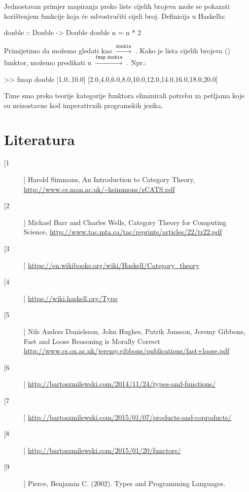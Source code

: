   Jednostavan primjer mapiranja preko liste cijelih brojeva može se pokazati
  korištenjem funkcije  koja će udvostručiti cijeli broj.
  Definicija  u Haskellu:
  \begin{mcode}
    double :: Double -> Double
    double n = n * 2
  \end{mcode}
  Primijetimo da  možemo gledati kao 
  $\xrightarrow{\texttt{double}}$ . Kako je lista cijelih
  brojeva (\codei{[Double]}) funktor, možemo preslikati  
  u \codei{[Double]} $\xrightarrow{\texttt{fmap double}}$
  \codei{[Double]}. Npr.:
  \begin{mcode}
    >> fmap double [1.0..10.0]
    [2.0,4.0,6.0,8.0,10.0,12.0,14.0,16.0,18.0,20.0]
  \end{mcode}
  Time smo preko teorije kategorije funktora eliminirali potrebu za
  petljama koje su neizostavne kod imperativnih programskih jezika.
  \newpage
  \section*{Literatura}
  \begin{description}
    \item[[1]]
      Harold Simmons, An Introduction to Category Theory,
      \url{http://www.cs.man.ac.uk/~hsimmons/zCATS.pdf}
    \item[[2]]
      Michael Barr and Charles Wells, Category Theory for Computing
      Science,
      \url{http://www.tac.mta.ca/tac/reprints/articles/22/tr22.pdf}
    \item[[3]]
      \url {https://en.wikibooks.org/wiki/Haskell/Category\_theory}
    \item[[4]]
      \url {https://wiki.haskell.org/Type}

    \item[[5]] \label{bib:fast-loose}
      Nils Anders Danielsson, John Hughes, Patrik Jansson, Jeremy Gibbons,
Fast and Loose Reasoning is Morally Correct
\url{http://www.cs.ox.ac.uk/jeremy.gibbons/publications/fast+loose.pdf}
  \item[[6]]
    \url{http://bartoszmilewski.com/2014/11/24/types-and-functions/}
  \item[[7]]
    \url{http://bartoszmilewski.com/2015/01/07/products-and-coproducts/}
  \item[[8]]
    \url{http://bartoszmilewski.com/2015/01/20/functors/}
  \item[[9]]
    Pierce, Benjamin C. (2002). Types and Programming Languages.
  \end{description}
